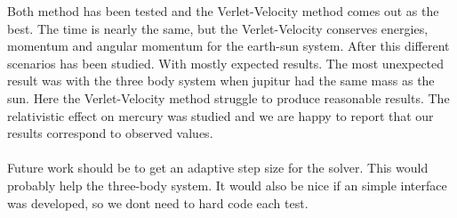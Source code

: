 Both method has been tested and the Verlet-Velocity method comes out as the best. The time is nearly the same, but the Verlet-Velocity conserves energies, momentum and angular momentum for the earth-sun system. After this different scenarios has been studied.  With mostly expected results. The most unexpected result was with the three body system when jupitur had the same mass as the sun. Here the Verlet-Velocity method struggle to produce reasonable results. The relativistic effect on mercury was studied and we are happy to report that our results correspond to observed values\cite{project3}.
\\
\\
Future work should be to get an adaptive step size for the solver. This would probably help the three-body system. It would also be nice if an simple interface was developed, so we dont need to hard code each test. 